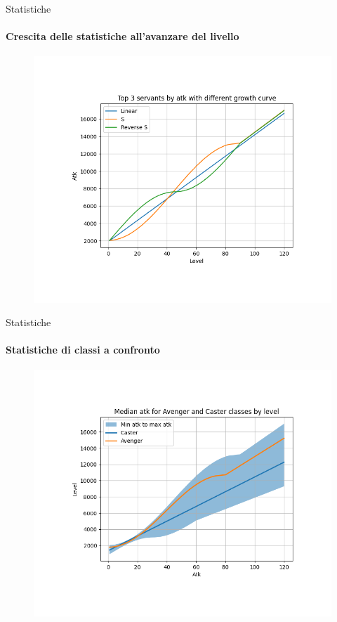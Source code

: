 \documentclass{beamer}
\begin{document}
\begin{darkframes}
  \begin{frame}{Statistiche}
    \framesubtitle{Crescita delle statistiche all'avanzare del livello}
    \begin{figure}
      \centering
      \includegraphics[scale=0.55]{./images/growth.png}
    \end{figure}
  \end{frame}

  \begin{frame}{Statistiche}
    \framesubtitle{Statistiche di classi a confronto}
    \begin{figure}
      \centering
      \includegraphics[scale=0.55]{./images/caster_vs_avenger.png}
    \end{figure}
  \end{frame}


\end{darkframes}
\end{document}
